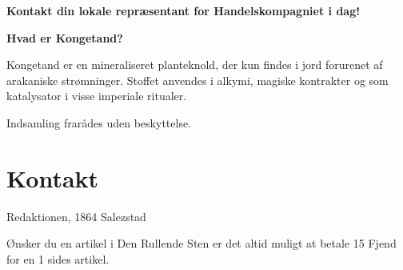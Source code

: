\documentclass[letterpaper,12pt]{memoir}
\newcommand{\separator}{%
  \par\noindent{\color{black!40}\rule{\textwidth}{0.4pt}}\par
}
\begin{document}
\textbf{Kontakt din lokale repræsentant for Handelskompagniet i dag!}

\separator
\begin{tcolorbox}
\textbf{Hvad er Kongetand?}

Kongetand er en mineraliseret planteknold, der kun findes i jord
forurenet af arakaniske strømninger. Stoffet anvendes i alkymi, magiske
kontrakter og som katalysator i visse imperiale ritualer.

Indsamling frarådes uden beskyttelse.
\end{tcolorbox}
\section*{Kontakt}
Redaktionen, 1864 Salezstad

Ønsker du en artikel i Den Rullende Sten er det altid muligt at betale 15 Fjend for en 1 sides artikel.
\end{document}
